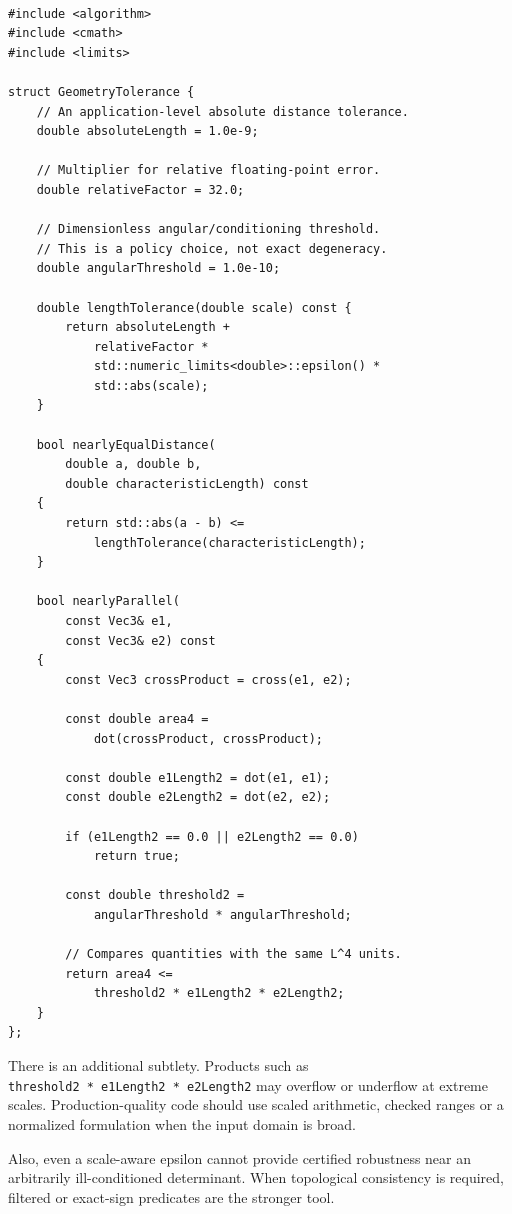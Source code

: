 \begin{verbatim}

#include <algorithm>
#include <cmath>
#include <limits>

struct GeometryTolerance {
    // An application-level absolute distance tolerance.
    double absoluteLength = 1.0e-9;

    // Multiplier for relative floating-point error.
    double relativeFactor = 32.0;

    // Dimensionless angular/conditioning threshold.
    // This is a policy choice, not exact degeneracy.
    double angularThreshold = 1.0e-10;

    double lengthTolerance(double scale) const {
        return absoluteLength +
            relativeFactor *
            std::numeric_limits<double>::epsilon() *
            std::abs(scale);
    }

    bool nearlyEqualDistance(
        double a, double b,
        double characteristicLength) const
    {
        return std::abs(a - b) <=
            lengthTolerance(characteristicLength);
    }

    bool nearlyParallel(
        const Vec3& e1,
        const Vec3& e2) const
    {
        const Vec3 crossProduct = cross(e1, e2);

        const double area4 =
            dot(crossProduct, crossProduct);

        const double e1Length2 = dot(e1, e1);
        const double e2Length2 = dot(e2, e2);

        if (e1Length2 == 0.0 || e2Length2 == 0.0)
            return true;

        const double threshold2 =
            angularThreshold * angularThreshold;

        // Compares quantities with the same L^4 units.
        return area4 <=
            threshold2 * e1Length2 * e2Length2;
    }
};
\end{verbatim}

There is an additional subtlety. Products such as \texttt{threshold2\ *\ e1Length2\ *\ e2Length2} may overflow or underflow at extreme scales. Production-quality code should use scaled arithmetic, checked ranges or a normalized formulation when the input domain is broad.

Also, even a scale-aware epsilon cannot provide certified robustness near an arbitrarily ill-conditioned determinant. When topological consistency is required, filtered or exact-sign predicates are the stronger tool.

